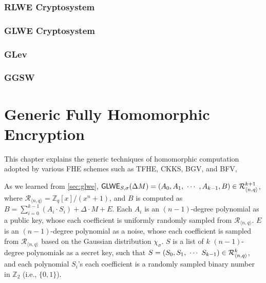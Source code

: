 \documentclass[11pt]{article}
\begin{document}
\clearpage

\section{RLWE Cryptosystem}
\label{sec:rlwe}


\clearpage

\section{GLWE Cryptosystem} 
\label{sec:glwe}


\clearpage

\section{GLev}
\label{sec:glev}


\clearpage

\section{GGSW}
\label{sec:ggsw}


\clearpage


\part{Generic Fully Homomorphic Encryption}
\label{part:generic-fhe}

\renewcommand{\thesection}{C-\arabic{section}}
\setcounter{section}{0}

This chapter explains the generic techniques of homomorphic computation adopted by various FHE schemes such as TFHE, CKKS, BGV, and BFV,

As we learned from \autoref{sec:glwe}, $\textsf{GLWE}_{S,\sigma}(\Delta M) = (A_0, A_1, \text{ } \text{$\cdots$} \text{ } , A_{k-1}, B) \in \mathcal{R}_{\langle n, q \rangle }^{k + 1}$, where $\mathcal{R}_{\langle n,q \rangle} = \mathbb{Z}_q[x] / (x^n + 1)$, and $B$ is computed as $B = \sum\limits_{i=0}^{k-1}{(A_i \cdot S_i)} + \Delta \cdot M + E$. Each $A_i$ is an $(n-1)$-degree polynomial as a public key, whose each coefficient is uniformly randomly sampled from $\mathcal{R}_{\langle n, q \rangle }$. $E$ is an $(n-1)$-degree polynomial as a noise, whose each coefficient is sampled from $\mathcal{R}_{\langle n, q \rangle }$ based on the Gaussian distribution $\chi_\sigma$. $S$ is a list of $k$ $(n-1)$-degree polynomials as a secret key, such that $S = (S_0, S_1, \text{ } \text{$\cdots$} \text{ } S_{k-1} ) \in \mathcal{R}_{\langle n, q \rangle }^k$, and each polynomial $S_i$'s each coefficient is a randomly sampled binary number in $\mathbb{Z}_2$ (i.e., $\{0, 1\}$). 
\end{document}

